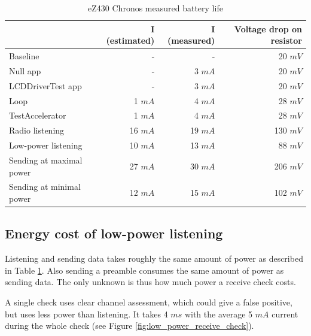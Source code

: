 \begin{table}[h]
  \centering
    \begin{tabular}{|l|r|r|r|}
        \hline
              & \textbf{I (estimated)} & \textbf{I (measured)}          & \textbf{Voltage drop on resistor}  \\ \hline
Baseline & - & - & 20 $ mV $ \\ \hline
Null app    & - & 3 $ mA $          & 20 $ mV $  \\ \hline
LCDDriverTest app    & - & 3 $ mA $ & 20 $ mV $  \\ \hline
Loop    & 1 $ mA $ & 4 $ mA $          & 28 $ mV $  \\ \hline
TestAccelerator     & 1 $ mA $ & 4 $ mA $          & 28 $ mV $  \\ \hline
Radio listening     & 16 $ mA $ & 19 $ mA $   & 130 $ mV $  \\ \hline
Low-power listening     & 10 $ mA $ & 13 $ mA $              & 88 $ mV $  \\ \hline
Sending at maximal power     & 27 $ mA $ & 30 $ mA $              & 206 $ mV $  \\ \hline
Sending at minimal power      & 12 $ mA $ & 15 $ mA $            & 102 $ mV $  \\ \hline

    \end{tabular}
  \caption{eZ430 Chronos measured battery life}
  \label{tab:power-usage}
\end{table}

\subsection{Energy cost of low-power listening}

Listening and sending data takes roughly the same amount of power as described in Table \ref{tab:power-usage}.
Also sending a preamble consumes the same amount of power as sending data.
The only unknown is thus how much power a receive check costs.

A single check uses clear channel assessment, which could give a false positive, but uses less power than listening.
It takes 4 $ ms $ with the average 5 $ mA $ current during the whole check (see Figure \ref{fig:low_power_receive_check}).

